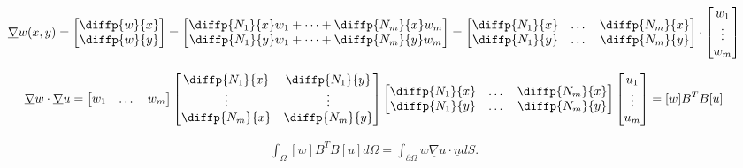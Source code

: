 \documentclass{book}
\begin{document}
\begin{align*}
    \underline{\nabla} w(x, y) = \begin{bmatrix}
        \diffp{w}{x} \\
        \diffp{w}{y} \\
        \end{bmatrix}
        = 
        \begin{bmatrix}
            \diffp{N_1}{x}w_1 + \dots + \diffp{N_m}{x}w_m \\
            \diffp{N_1}{y}w_1 + \dots + \diffp{N_m}{y}w_m \\
        \end{bmatrix}
        =
        \begin{bmatrix}
            \diffp{N_1}{x} & \dots & \diffp{N_m}{x} \\
            \diffp{N_1}{y} & \dots & \diffp{N_m}{y} 
        \end{bmatrix} \cdot \begin{bmatrix}
            w_1 \\
            \vdots \\
            w_m 
        \end{bmatrix}
\end{align*}

\begin{align*}
    \underline{\nabla}w \cdot \underline{\nabla}u
    =
    \begin{bmatrix}
        w_1 & \dots & w_m
    \end{bmatrix}
    \begin{bmatrix}
        \diffp{N_1}{x} & \diffp{N_1}{y} \\
        \vdots & \vdots \\
        \diffp{N_m}{x} & \diffp{N_m}{y} 
    \end{bmatrix}
    \begin{bmatrix}
        \diffp{N_1}{x} & \dots & \diffp{N_m}{x} \\
        \diffp{N_1}{y} & \dots & \diffp{N_m}{y} 
    \end{bmatrix}
    \begin{bmatrix}
        u_1 \\
        \vdots \\
        u_m 
    \end{bmatrix}
    = [w] B^T B [u]
\end{align*}

\begin{align*}
    \boxed{\int_{\Omega} [w] B^T B [u] d\Omega = \int_{\partial\Omega} w \underline{\nabla} u \cdot \underline{n} dS}.
\end{align*}
\end{document}
